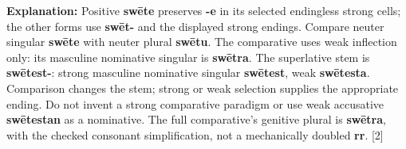 \textbf{Explanation:} Positive \textbf{swēte} preserves \textbf{-e} in its selected endingless strong cells; the other forms use \textbf{swēt-} and the displayed strong endings. Compare neuter singular \textbf{swēte} with neuter plural \textbf{swētu}. The comparative uses weak inflection only: its masculine nominative singular is \textbf{swētra}. The superlative stem is \textbf{swētest-}: strong masculine nominative singular \textbf{swētest}, weak \textbf{swētesta}. Comparison changes the stem; strong or weak selection supplies the appropriate ending. Do not invent a strong comparative paradigm or use weak accusative \textbf{swētestan} as a nominative. The full comparative’s genitive plural is \textbf{swētra}, with the checked consonant simplification, not a mechanically doubled \textbf{rr}. [2]

